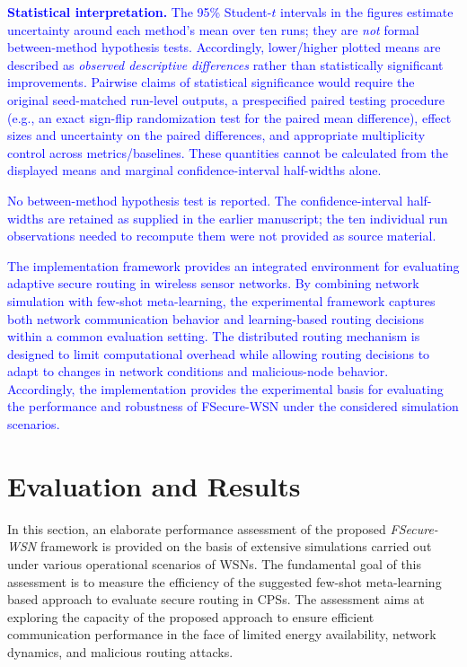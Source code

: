 \documentclass[pdflatex,sn-mathphys-num]{sn-jnl}
\newcommand{\Revised}[1]{\textcolor{blue}{#1}}
\begin{document}

\textcolor{blue}{\textbf{Statistical interpretation.} The 95\% Student-$t$ intervals in the figures estimate uncertainty around each method's mean over ten runs; they are \emph{not} formal between-method hypothesis tests. Accordingly, lower/higher plotted means are described as \emph{observed descriptive differences} rather than statistically significant improvements. Pairwise claims of statistical significance would require the original seed-matched run-level outputs, a prespecified paired testing procedure (e.g., an exact sign-flip randomization test for the paired mean difference), effect sizes and uncertainty on the paired differences, and appropriate multiplicity control across metrics/baselines. These quantities cannot be calculated from the displayed means and marginal confidence-interval half-widths alone.}\par
\Revised{No between-method hypothesis test is reported. The confidence-interval half-widths are retained as supplied in the earlier manuscript; the ten individual run observations needed to recompute them were not provided as source material.}\par
\textcolor{blue}{The implementation framework provides an integrated environment for evaluating adaptive secure routing in wireless sensor networks. By combining network simulation with few-shot meta-learning, the experimental framework captures both network communication behavior and learning-based routing decisions within a common evaluation setting. The distributed routing mechanism is designed to limit computational overhead while allowing routing decisions to adapt to changes in network conditions and malicious-node behavior. Accordingly, the implementation provides the experimental basis for evaluating the performance and robustness of FSecure-WSN under the considered simulation scenarios.}

\section{Evaluation and Results}
\label{sec:results}

In this section, an elaborate performance assessment of the proposed
\textit{FSecure-WSN} framework is provided on the basis of extensive
simulations carried out under various operational scenarios of WSNs. The
fundamental goal of this assessment is to measure the efficiency of the
suggested few-shot meta-learning based approach to evaluate secure routing in
CPSs. The assessment aims at exploring the capacity of the proposed approach
to ensure efficient communication performance in the face of limited energy
availability, network dynamics, and malicious routing attacks.
\end{document}
